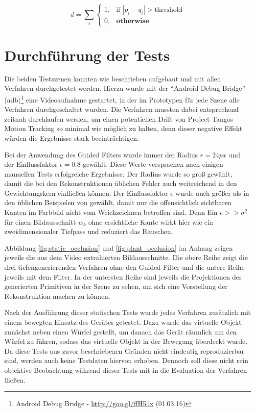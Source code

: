 \begin{equation} \label{eq:diff}
d = \sum_i 
	\begin{cases}
		1, & \text{if } | p_i - q_i | > \text{threshold} \\
		0, & \textbf{otherwise}
	\end{cases}
\end{equation}

\section{Durchführung der Tests}

Die beiden Testszenen konnten wie beschrieben aufgebaut und mit allen Verfahren durchgetestet werden. Hierzu wurde mit der \enquote{Android Debug Bridge} (adb)\footnote{Android Debug Bridge - \url{http://goo.gl/ffH51x} (01.03.16)} eine Videoaufnahme gestartet, in der im Prototypen für jede Szene alle Verfahren durchgeschaltet wurden. Die Verfahren mussten dabei entsprechend zeitnah durchlaufen werden, um einen potentiellen Drift von Project Tangos Motion Tracking so minimal wie möglich zu halten, denn dieser negative Effekt würden die Ergebnisse stark beeinträchtigen. 

Bei der Anwendung des Guided Filters wurde immer der Radius \(r = 24px\) und der Einflussfaktor \(\epsilon = 0.8\) gewählt. Diese Werte versprachen nach einigen manuellen Tests erfolgreiche Ergebnisse. Der Radius wurde so groß gewählt, damit die bei den Rekonstruktionen üblichen Fehler auch weitreichend in den Gewichtungskern einfließen können. Der Einflussfaktor \(\epsilon\) wurde auch größer als in den üblichen Beispielen von \citep{he2010guided} gewählt, damit nur die offensichtlich sichtbaren Kanten im Farbbild nicht vom Weichzeichnen betroffen sind. Denn Ein \(\epsilon >> \sigma^2 \) für einen Bildausschnitt \(w_k\) ohne ersichtliche Kante wirkt hier wie ein zweidimensionaler Tiefpass und reduziert das Rauschen.

Abbildung \ref{fig:static_occlusion} und \ref{fig:plant_occlusion} im Anhang zeigen jeweils die aus dem Video extrahierten Bildausschnitte. Die obere Reihe zeigt die drei tiefengenerierenden Verfahren ohne den Guided Filter und die untere Reihe jeweils mit dem Filter. In der untersten Reihe sind jeweils die Projektionen der generierten Primitiven in der Szene zu sehen, um sich eine Vorstellung der Rekonstruktion machen zu können.

Nach der Ausführung dieser statischen Tests wurde jedes Verfahren zusätzlich mit einem bewegten Einsatz des Gerätes getestet. Dazu wurde das virtuelle Objekt zunächst neben einen Würfel gestellt, um danach das Gerät räumlich um den Würfel zu führen, sodass das virtuelle Objekt in der Bewegung überdeckt wurde. Da diese Tests aus zuvor beschriebenen Gründen nicht eindeutig reproduzierbar sind, werden auch keine Testdaten hiervon erhoben. Dennoch soll diese nicht rein objektive Beobachtung während dieser Tests mit in die Evaluation der Verfahren fließen.

